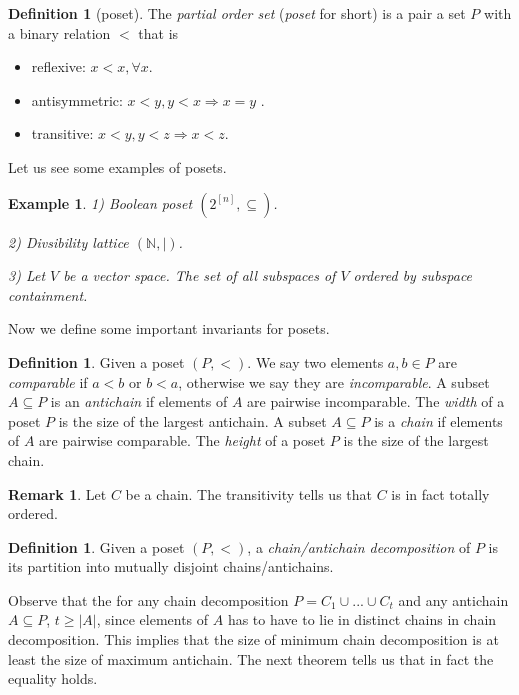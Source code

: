 \documentclass{article}
\newtheorem{example}[theorem]{Example}
\theoremstyle{definition}
\newtheorem{remark}[theorem]{Remark}
\newtheorem{definition}[theorem]{Definition}
\begin{document}
\begin{definition}[poset]
    The \emph{partial order set} (\emph{poset} for short) is a pair a set $P$ with  a binary relation $<$ that is
    \begin{itemize}
        \item reflexive: $x<x, \forall x$.

        \item antisymmetric: $x<y, y<x \Rightarrow x=y$ .

        \item transitive: $x<y, y<z \Rightarrow x<z$.
    \end{itemize}
\end{definition}

Let us see some examples of posets.

\begin{example}
    1) Boolean poset $(2^{[n]}, \subseteq)$.

    2) Divsibility lattice $(\mathbb{N}, |)$.

    3) Let $V$ be a vector space. The set of all subspaces of $V$ ordered by subspace containment.
\end{example}

Now we define some important invariants for posets.

\begin{definition}
    Given a poset $(P,<)$. We say two elements $a,b \in P$ are \emph{comparable} if $a<b$ or $b < a$, otherwise we say they are \emph{incomparable}.
    A subset $A \subseteq P$ is an \emph{antichain} if elements of $A$ are pairwise incomparable. The \emph{width} of a poset $P$ is the size of the largest antichain.
    A subset $A \subseteq P$ is a \emph{chain} if elements of $A$ are pairwise comparable. The \emph{height} of a poset $P$ is the size of the largest chain.
\end{definition}

\begin{remark}
    Let $C$ be a chain. The transitivity tells us that $C$ is in fact totally ordered. 
\end{remark}

\begin{definition}
    Given a poset $(P,<)$, a \emph{chain/antichain decomposition} of $P$ is its partition into mutually disjoint chains/antichains.
\end{definition} 

Observe that the for any chain decomposition $P = C_1 \cup ...\cup C_t$ and any antichain $A \subseteq P$, $t \geq |A|$, since elements of $A$ has to have to lie in distinct chains in chain decomposition. This implies that the size of minimum chain decomposition is at least the size of maximum antichain. The next theorem tells us that in fact the equality holds. 
\end{document}
